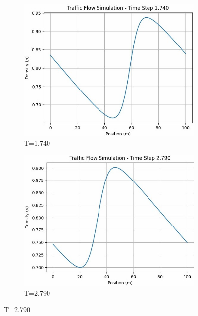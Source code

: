 \documentclass{article}
\begin{document}
	
	\begin{figure}[H]
		\centering
		\begin{subfigure}{0.4\textwidth}
			\centering
			\includegraphics[width=\textwidth]{AniE1_LF.jpg}
			\caption{T=1.740}
			\label{fig:1740}
		\end{subfigure}
		\begin{subfigure}{0.4\textwidth}
			\centering
			\includegraphics[width=\textwidth]{AniE2_LF.jpg}
			\caption{T=2.790}
			\label{fig:2790}
		\end{subfigure}
		
		\vspace{0.5cm}
		

\end{figure}
\end{document}
